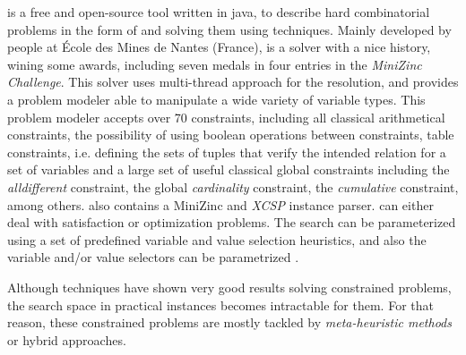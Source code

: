 \choco{} is a free and open-source tool written in java, to describe hard combinatorial problems in the form of \csps{} and solving them using \CP{} techniques. Mainly developed by people at \'Ecole des Mines de Nantes (France), is a solver with a nice history, wining some awards, including seven medals in four entries in the \textit{MiniZinc Challenge}. This solver uses multi-thread approach for the resolution, and provides a problem modeler able to manipulate a wide variety of variable types. This problem modeler accepts over 70 constraints, including all classical arithmetical constraints, the possibility of using boolean operations between constraints, table constraints, i.e. defining the sets of tuples that verify the intended relation for a set of variables and a large set of useful classical global constraints including the \textit{alldifferent} constraint, the global \textit{cardinality} constraint, the \textit{cumulative} constraint, among others. \choco{} also contains a {\sc MiniZinc} and \textit{XCSP} instance parser. 
\choco{} can either deal with satisfaction or optimization problems. The search can be parameterized using a set of predefined variable and value selection heuristics, and also the variable and/or value selectors can be parametrized \cite{Jussien2008, Prudhomme2016}.

Although \cp{} techniques have shown very good results solving constrained problems, the search space in practical instances becomes intractable for them. For that reason, these constrained problems are mostly tackled by {\it meta-heuristic methods} or hybrid approaches. %